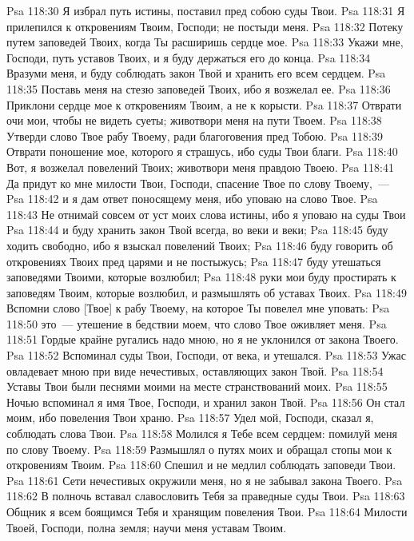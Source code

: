 \vs Psa 118:30 Я избрал путь истины, поставил пред собою суды Твои.
\vs Psa 118:31 Я прилепился к откровениям Твоим, Господи; не постыди меня.
\vs Psa 118:32 Потеку путем заповедей Твоих, когда Ты расширишь сердце мое.
\vs Psa 118:33 Укажи мне, Господи, путь уставов Твоих, и я буду держаться его до конца.
\vs Psa 118:34 Вразуми меня, и буду соблюдать закон Твой и хранить его всем сердцем.
\vs Psa 118:35 Поставь меня на стезю заповедей Твоих, ибо я возжелал ее.
\vs Psa 118:36 Приклони сердце мое к откровениям Твоим, а не к корысти.
\vs Psa 118:37 Отврати очи мои, чтобы не видеть суеты; животвори меня на пути Твоем.
\vs Psa 118:38 Утверди слово Твое рабу Твоему, ради благоговения пред Тобою.
\vs Psa 118:39 Отврати поношение мое, которого я страшусь, ибо суды Твои благи.
\vs Psa 118:40 Вот, я возжелал повелений Твоих; животвори меня правдою Твоею.
\vs Psa 118:41 Да придут ко мне милости Твои, Господи, спасение Твое по слову Твоему,~---
\vs Psa 118:42 и я дам ответ поносящему меня, ибо уповаю на слово Твое.
\vs Psa 118:43 Не отнимай совсем от уст моих слова истины, ибо я уповаю на суды Твои
\vs Psa 118:44 и буду хранить закон Твой всегда, во веки и веки;
\vs Psa 118:45 буду ходить свободно, ибо я взыскал повелений Твоих;
\vs Psa 118:46 буду говорить об откровениях Твоих пред царями и не постыжусь;
\vs Psa 118:47 буду утешаться заповедями Твоими, которые возлюбил;
\vs Psa 118:48 руки мои буду простирать к заповедям Твоим, которые возлюбил, и размышлять об уставах Твоих.
\vs Psa 118:49 Вспомни слово [Твое] к рабу Твоему, на которое Ты повелел мне уповать:
\vs Psa 118:50 это~--- утешение в бедствии моем, что слово Твое оживляет меня.
\vs Psa 118:51 Гордые крайне ругались надо мною, но я не уклонился от закона Твоего.
\vs Psa 118:52 Вспоминал суды Твои, Господи, от века, и утешался.
\vs Psa 118:53 Ужас овладевает мною при виде нечестивых, оставляющих закон Твой.
\vs Psa 118:54 Уставы Твои были песнями моими на месте странствований моих.
\vs Psa 118:55 Ночью вспоминал я имя Твое, Господи, и хранил закон Твой.
\vs Psa 118:56 Он стал моим, ибо повеления Твои храню.
\vs Psa 118:57 Удел мой, Господи, сказал я, соблюдать слова Твои.
\vs Psa 118:58 Молился я Тебе всем сердцем: помилуй меня по слову Твоему.
\vs Psa 118:59 Размышлял о путях моих и обращал стопы мои к откровениям Твоим.
\vs Psa 118:60 Спешил и не медлил соблюдать заповеди Твои.
\vs Psa 118:61 Сети нечестивых окружили меня, но я не забывал закона Твоего.
\vs Psa 118:62 В полночь вставал славословить Тебя за праведные суды Твои.
\vs Psa 118:63 Общник я всем боящимся Тебя и хранящим повеления Твои.
\vs Psa 118:64 Милости Твоей, Господи, полна земля; научи меня уставам Твоим.
